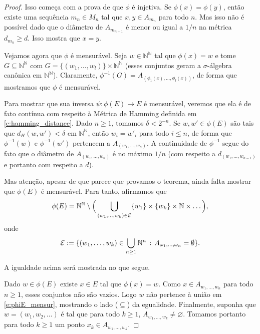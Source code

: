 \begin{proof}
  Isso começa com a prova de que $\phi$ é injetiva.
  Se $\phi(x) = \phi(y)$, então existe uma sequência $m_n \in M_n$ tal que $x, y \in A_{m_n}$ para todo $n$.
  Mas isso não é possível dado que o diâmetro de $A_{m_{n+1}}$ é menor ou igual a $1/n$ na métrica $d_{m_n} \geq d$.
  Isso mostra que $x = y$.

  Vejamos agora que $\phi$ é mensurável.
  Seja $w \in \mathbb{N}^\mathbb{N}$ tal que $\phi(x) = w$ e tome $G \subseteq \mathbb{N}^\mathbb{N}$ com $G = \{(w_1, \dots, w_l)\} \times \mathbb{N}^\mathbb{N}$ (esses conjuntos geram a $\sigma$-álgebra canônica em $\mathbb{N}^\mathbb{N}$).
  Claramente, $\phi^{-1}(G) = A_{(\phi_1(x), \dots, \phi_l(x))}$, de forma que mostramos que $\phi$ é mensurável.

  Para mostrar que sua inversa $\psi:\phi(E) \to E$ é mensurável, veremos que ela é de fato contínua com respeito à Métrica de Hamming definida em \eqref{e:hamming_distance}.
  Dado $n \geq 1$, tomamos $\delta < 2^{-n}$.
  Se $w, w' \in \phi(E)$ são tais que $d_H(w, w') < \delta$ em $\mathbb{N}^\mathbb{N}$, então $w_i = w'_i$ para todo $i \leq n$, de forma que $\phi^{-1}(w)$ e $\phi^{-1}(w')$ pertencem a $A_{(w_1, \dots, w_n)}$.
  A continuidade de $\phi^{-1}$ segue do fato que o diâmetro de $A_{(w_1, \dots, w_n)}$ é no máximo $1/n$ (com respeito a $d_{(w_1, \dots, w_{n-1})}$ e portanto com respeito a $d$).

  Mas atenção, apesar de que parece que provamos o teorema, ainda falta mostrar que $\phi(E)$ é mensurável.
  Para tanto, afirmamos que
  \begin{equation}
    \label{e:phiE_mensur}
    \phi(E) = \mathbb{N}^\mathbb{N} \setminus \Big( \bigcup_{(w_1, \dots, w_k)\in {\ensuremath{\mathcal E}}} \{w_1\} \times \{w_k\} \times \mathbb{N} \times \dots \Big),
  \end{equation}
  onde
  \begin{equation*}
   {\ensuremath{\mathcal E}}:=\{ (w_1, \dots, w_k)\in \bigcup_{n\ge 1} {\mathbb N}^n \, : \, A_{\omega_1,\dots,\omega_n}=\emptyset \}.  
  \end{equation*}

  A igualdade acima será mostrada no que segue.

  Dado $w \in \phi(E)$ existe $x \in E$ tal que $\phi(x) = w$.
  Como $x \in A_{w_1, \dots, w_n}$ para todo $n \geq 1$, esses conjuntos não são vazios.
  Logo $w$ não pertence à união em \eqref{e:phiE_mensur}, mostrando o lado ($\subseteq$) da egualidade.
  Finalmente, suponha que $w = (w_1, w_2, \dots)$ é tal que para todo $k \geq 1$, $A_{w_1, \dots, w_k} \neq \varnothing$.
  Tomamos portanto para todo $k \geq 1$ um ponto $x_k \in A_{w_1, \dots, w_k}$.


\end{proof}
